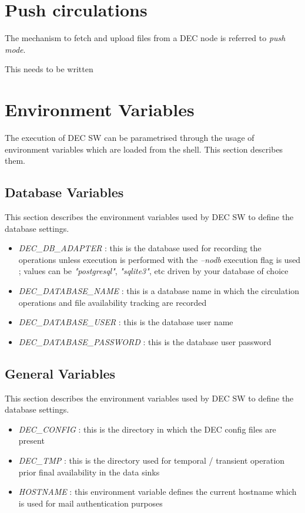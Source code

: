 \documentclass[dec_sum_main.tex]{subfiles}
\begin{document}
\section{Push circulations}

The mechanism to fetch and upload files from a DEC node is referred to \textit{push mode}.

This needs to be written



\section{Environment Variables}

The execution of DEC SW can be parametrised through the usage of environment variables which are loaded from the shell. This section describes them.
\par
\noindent
\subsection{Database Variables} \label{Database Variables}
This section describes the environment variables used by DEC SW to define the database settings.
\begin{itemize}
	\item \textit{DEC\_DB\_ADAPTER} : this is the database used for recording the operations unless execution is performed with the \textit{--nodb} execution flag is used ; values can be \textit{"postgresql"}, \textit{"sqlite3"}, etc driven by your database of choice 
	\item \textit{DEC\_DATABASE\_NAME} : this is a database name in which the circulation operations and file availability tracking are recorded
	\item \textit{DEC\_DATABASE\_USER} : this is the database user name
	\item \textit{DEC\_DATABASE\_PASSWORD} : this is the database user password
\end{itemize}

\subsection{General Variables} \label{General Variables}
This section describes the environment variables used by DEC SW to define the database settings.
\begin{itemize}
	\item \textit{DEC\_CONFIG} : this is the directory in which the DEC config files are present
	\item \textit{DEC\_TMP} : this is the directory used for temporal / transient operation prior final availability in the data sinks
	\item \textit{HOSTNAME} : this environment variable defines the current hostname which is used for mail authentication purposes	
\end{itemize}
\end{document}
